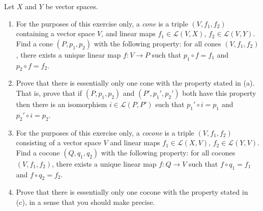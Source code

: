 \documentclass[letterpaper, 12pt]{hmcpset}
\begin{document}
\begin{problem}[0.14]
	Let $X$ and $Y$ be vector spaces.
	\begin{enumerate}
		\item For the purposes of this exercise only, a \textit{cone} is a triple $(V, f_1, f_2)$ containing a vector space $V$, and linear maps $f_1 \in \mathcal L(V, X)$, $f_2 \in \mathcal L(V, Y)$. Find a cone $(P, p_1, p_2)$ with the following property: for all cones $(V, f_1, f_2)$, there exists a unique linear map $f : V \to P$ such that $p_1 \circ f = f_1$ and $p_2 \circ f = f_2$.
		\item Prove that there is essentially only one cone with the property stated in (a). That is, prove that if $(P, p_1, p_2)$ and $(P', p_1', p_2')$ both have this property then there is an isomorphism $i \in \mathcal L(P, P')$ such that $p_1' \circ i = p_1$ and $p_2' \circ i = p_2$.
		\item For the purposes of this exercise only, a \textit{cocone} is a triple $(V, f_1, f_2)$ consisting of a vector space $V$ and linear maps $f_1 \in \mathcal L(X, V)$, $f_2 \in \mathcal L(Y, V)$. Find a cocone $(Q, q_1, q_2)$ with the following property: for all cocones $(V, f_1, f_2)$, there exists a unique linear map $f : Q \to V$ such that $f \circ q_1 = f_1$ and $f \circ q_2 = f_2$.
		\item Prove that there is essentially only one cocone with the property stated in (c), in a sense that you should make precise.
	\end{enumerate}
\end{problem}
\end{document}
